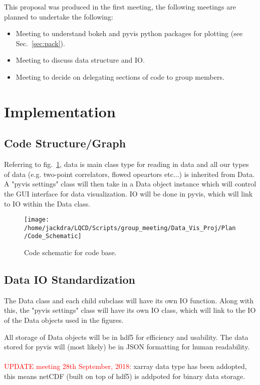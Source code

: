 \documentclass[letterpaper,11pt]{article}
\begin{document}
This proposal was produced in the first meeting, the following meetings are planned to undertake the following:

\begin{itemize}
  \item Meeting to understand bokeh and pyvis python packages for plotting (see Sec.~\ref{sec:pack}).
  \item Meeting to discuss data structure and IO.
  \item Meeting to decide on delegating sections of code to group members.
\end{itemize}

\section{Implementation \label{sec:imp}}

\subsection{Code Structure/Graph}
Referring to fig.~\ref{code_sch}, data is main class type for reading in data and all our types of data
(e.g. two-point correlators, flowed opeartors etc...) is inherited from Data.
A "pyvis settings" class will then take in a Data object instance which will control the GUI interface for data visualization.
IO will be done in pyvis, which will link to IO within the Data class.
\begin{figure}
  \centering
  \texttt{[image: /home/jackdra/LQCD/Scripts/group\_meeting/Data\_Vis\_Proj/Plan/Code\_Schematic]}
  \caption{\label{code_sch}Code schematic for code base. }
\end{figure}
\subsection{Data IO Standardization}


The Data class and each child subclass will have its own IO function. Along with this, the "pyvis settings" class will have its own
IO class, which will link to the IO of the Data objects used in the figures.

All storage of Data objects will be in hdf5 for efficiency and usability. The data stored for pyvis will (most likely) be in JSON formatting
for human readability.
\\ \hline \\
\vspace*{0.5cm}
\textcolor{red}{UPDATE meeting 28th September, 2018:} xarray data type has been addopted, this means netCDF (built on top of hdf5) is addpoted for binary data storage.
\\ \hline \\
\vspace*{0.5cm}
\end{document}
